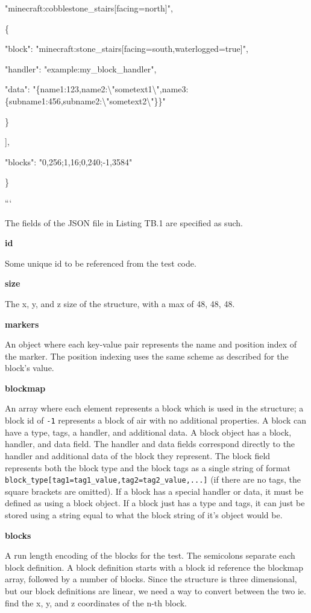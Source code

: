 \documentclass{article}
\def\code#1{\texttt{#1}}
\begin{document}
\begin{onehalfspacing}
"minecraft:cobblestone\_stairs{[}facing=north{]}",

\{

"block": "minecraft:stone\_stairs{[}facing=south,waterlogged=true{]}",

"handler": "example:my\_block\_handler",

"data":
"\{name1:123,name2:\textbackslash"sometext1\textbackslash",name3:\{subname1:456,subname2:\textbackslash"sometext2\textbackslash"\}\}"

\}

{]},

"blocks": "0,256;1,16;0,240;-1,3584"

\}

```

The fields of the JSON file in Listing TB.1 are specified as such.

\textbf{id}

Some unique id to be referenced from the test code.

\textbf{size}

The x, y, and z size of the structure, with a max of 48, 48, 48.

\textbf{markers}

An object where each key-value pair represents the name and position
index of the marker. The position indexing uses the same scheme as
described for the block's value.

\textbf{blockmap}

An array where each element represents a block which is used in the
structure; a block id of \code{-1} represents a block of air with no additional
properties. A block can have a type, tags, a handler, and additional
data. A block object has a block, handler, and data field. The handler
and data fields correspond directly to the handler and additional data
of the block they represent. The block field represents both the block
type and the block tags as a single string of format
\code{block\_type{[}tag1=tag1\_value,tag2=tag2\_value,...{]}} (if there are
no tags, the square brackets are omitted). If a block has a special
handler or data, it must be defined as using a block object. If a block
just has a type and tags, it can just be stored using a string equal to
what the block string of it's object would be.

\textbf{blocks}

A run length encoding of the blocks for the test. The semicolons
separate each block definition. A block definition starts with a block
id reference the blockmap array, followed by a number of blocks. Since
the structure is three dimensional, but our block definitions are
linear, we need a way to convert between the two ie. find the x, y, and
z coordinates of the n-th block.


\end{onehalfspacing}
\end{document}
